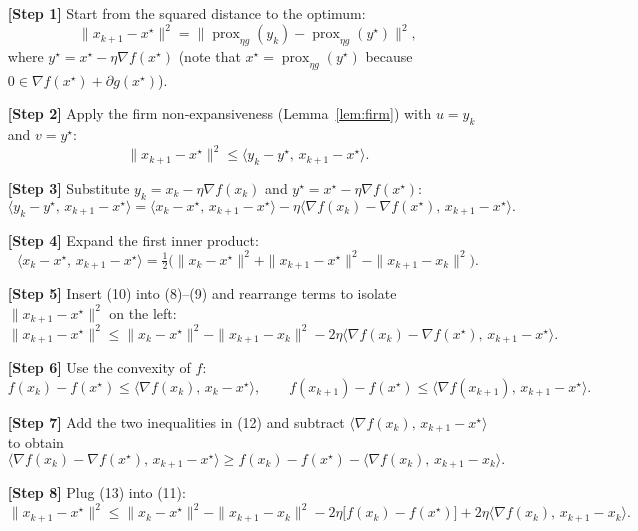 \documentclass{article}
\newcommand{\prox}{\operatorname{prox}}
\begin{document}
\begin{enumerate}
\item[\textbf{[Step 1]}]  Start from the squared distance to the optimum:
\[
\|x_{k+1}-x^{\star}\|^{2}
 =\| \prox_{\eta g}(y_{k})- \prox_{\eta g}(y^{\star})\|^{2},
\]
where $y^{\star}=x^{\star}-\eta\nabla f(x^{\star})$ (note that $x^{\star}= \prox_{\eta g}(y^{\star})$ because $0\in \nabla f(x^{\star})+\partial g(x^{\star})$).

\item[\textbf{[Step 2]}]  Apply the firm non‑expansiveness (Lemma~\ref{lem:firm}) with $u=y_{k}$ and $v=y^{\star}$:
\[
\|x_{k+1}-x^{\star}\|^{2}
\le \langle y_{k}-y^{\star},\,x_{k+1}-x^{\star}\rangle .
\tag{8}
\]

\item[\textbf{[Step 3]}]  Substitute $y_{k}=x_{k}-\eta\nabla f(x_{k})$ and $y^{\star}=x^{\star}-\eta\nabla f(x^{\star})$:
\[
\langle y_{k}-y^{\star},\,x_{k+1}-x^{\star}\rangle
= \langle x_{k}-x^{\star},\,x_{k+1}-x^{\star}\rangle
-\eta\langle\nabla f(x_{k})-\nabla f(x^{\star}),\,x_{k+1}-x^{\star}\rangle .
\tag{9}
\]

\item[\textbf{[Step 4]}]  Expand the first inner product:
\[
\langle x_{k}-x^{\star},\,x_{k+1}-x^{\star}\rangle
= \tfrac12\bigl(\|x_{k}-x^{\star}\|^{2}+\|x_{k+1}-x^{\star}\|^{2}
-\|x_{k+1}-x_{k}\|^{2}\bigr).
\tag{10}
\]

\item[\textbf{[Step 5]}]  Insert (10) into (8)–(9) and rearrange terms to isolate $\|x_{k+1}-x^{\star}\|^{2}$ on the left:
\[
\|x_{k+1}-x^{\star}\|^{2}
\le \|x_{k}-x^{\star}\|^{2}
-\|x_{k+1}-x_{k}\|^{2}
-2\eta\langle\nabla f(x_{k})-\nabla f(x^{\star}),\,x_{k+1}-x^{\star}\rangle .
\tag{11}
\]

\item[\textbf{[Step 6]}]  Use the convexity of $f$:
\[
f(x_{k})-f(x^{\star})\le \langle\nabla f(x_{k}),\,x_{k}-x^{\star}\rangle ,
\qquad
f(x_{k+1})-f(x^{\star})\le \langle\nabla f(x_{k+1}),\,x_{k+1}-x^{\star}\rangle .
\tag{12}
\]

\item[\textbf{[Step 7]}]  Add the two inequalities in (12) and subtract $\langle\nabla f(x_{k}),\,x_{k+1}-x^{\star}\rangle$ to obtain
\[
\langle\nabla f(x_{k})-\nabla f(x^{\star}),\,x_{k+1}-x^{\star}\rangle
\ge f(x_{k})-f(x^{\star}) -\langle\nabla f(x_{k}),\,x_{k+1}-x_{k}\rangle .
\tag{13}
\]

\item[\textbf{[Step 8]}]  Plug (13) into (11):
\[
\|x_{k+1}-x^{\star}\|^{2}
\le \|x_{k}-x^{\star}\|^{2}
-\|x_{k+1}-x_{k}\|^{2}
-2\eta\bigl[f(x_{k})-f(x^{\star})\bigr]
+2\eta\langle\nabla f(x_{k}),\,x_{k+1}-x_{k}\rangle .
\tag{14}
\]


\end{enumerate}
\end{document}
